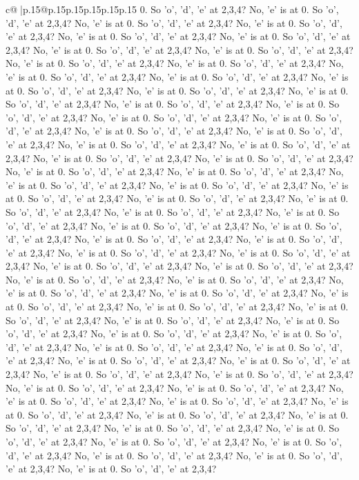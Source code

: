\documentclass{article}
\begin{document}
{\begin{supertabular}{c@{$\;$}|p{.15\linewidth}@{}p{.15\linewidth}p{.15\linewidth}p{.15\linewidth}p{.15\linewidth}p{.15\linewidth}}
{{{0. So 'o', 'd', 'e' at 2,3,4? No, 'e' is at 0. So 'o', 'd', 'e' at 2,3,4? No, 'e' is at 0. So 'o', 'd', 'e' at 2,3,4? No, 'e' is at 0. So 'o', 'd', 'e' at 2,3,4? No, 'e' is at 0. So 'o', 'd', 'e' at 2,3,4? No, 'e' is at 0. So 'o', 'd', 'e' at 2,3,4? No, 'e' is at 0. So 'o', 'd', 'e' at 2,3,4? No, 'e' is at 0. So 'o', 'd', 'e' at 2,3,4? No, 'e' is at 0. So 'o', 'd', 'e' at 2,3,4? No, 'e' is at 0. So 'o', 'd', 'e' at 2,3,4? No, 'e' is at 0. So 'o', 'd', 'e' at 2,3,4? No, 'e' is at 0. So 'o', 'd', 'e' at 2,3,4? No, 'e' is at 0. So 'o', 'd', 'e' at 2,3,4? No, 'e' is at 0. So 'o', 'd', 'e' at 2,3,4? No, 'e' is at 0. So 'o', 'd', 'e' at 2,3,4? No, 'e' is at 0. So 'o', 'd', 'e' at 2,3,4? No, 'e' is at 0. So 'o', 'd', 'e' at 2,3,4? No, 'e' is at 0. So 'o', 'd', 'e' at 2,3,4? No, 'e' is at 0. So 'o', 'd', 'e' at 2,3,4? No, 'e' is at 0. So 'o', 'd', 'e' at 2,3,4? No, 'e' is at 0. So 'o', 'd', 'e' at 2,3,4? No, 'e' is at 0. So 'o', 'd', 'e' at 2,3,4? No, 'e' is at 0. So 'o', 'd', 'e' at 2,3,4? No, 'e' is at 0. So 'o', 'd', 'e' at 2,3,4? No, 'e' is at 0. So 'o', 'd', 'e' at 2,3,4? No, 'e' is at 0. So 'o', 'd', 'e' at 2,3,4? No, 'e' is at 0. So 'o', 'd', 'e' at 2,3,4? No, 'e' is at 0. So 'o', 'd', 'e' at 2,3,4? No, 'e' is at 0. So 'o', 'd', 'e' at 2,3,4? No, 'e' is at 0. So 'o', 'd', 'e' at 2,3,4? No, 'e' is at 0. So 'o', 'd', 'e' at 2,3,4? No, 'e' is at 0. So 'o', 'd', 'e' at 2,3,4? No, 'e' is at 0. So 'o', 'd', 'e' at 2,3,4? No, 'e' is at 0. So 'o', 'd', 'e' at 2,3,4? No, 'e' is at 0. So 'o', 'd', 'e' at 2,3,4? No, 'e' is at 0. So 'o', 'd', 'e' at 2,3,4? No, 'e' is at 0. So 'o', 'd', 'e' at 2,3,4? No, 'e' is at 0. So 'o', 'd', 'e' at 2,3,4? No, 'e' is at 0. So 'o', 'd', 'e' at 2,3,4? No, 'e' is at 0. So 'o', 'd', 'e' at 2,3,4? No, 'e' is at 0. So 'o', 'd', 'e' at 2,3,4? No, 'e' is at 0. So 'o', 'd', 'e' at 2,3,4? No, 'e' is at 0. So 'o', 'd', 'e' at 2,3,4? No, 'e' is at 0. So 'o', 'd', 'e' at 2,3,4? No, 'e' is at 0. So 'o', 'd', 'e' at 2,3,4? No, 'e' is at 0. So 'o', 'd', 'e' at 2,3,4? No, 'e' is at 0. So 'o', 'd', 'e' at 2,3,4? No, 'e' is at 0. So 'o', 'd', 'e' at 2,3,4? No, 'e' is at 0. So 'o', 'd', 'e' at 2,3,4? No, 'e' is at 0. So 'o', 'd', 'e' at 2,3,4? No, 'e' is at 0. So 'o', 'd', 'e' at 2,3,4? No, 'e' is at 0. So 'o', 'd', 'e' at 2,3,4? No, 'e' is at 0. So 'o', 'd', 'e' at 2,3,4? No, 'e' is at 0. So 'o', 'd', 'e' at 2,3,4? No, 'e' is at 0. So 'o', 'd', 'e' at 2,3,4? No, 'e' is at 0. So 'o', 'd', 'e' at 2,3,4? No, 'e' is at 0. So 'o', 'd', 'e' at 2,3,4? No, 'e' is at 0. So 'o', 'd', 'e' at 2,3,4? No, 'e' is at 0. So 'o', 'd', 'e' at 2,3,4? No, 'e' is at 0. So 'o', 'd', 'e' at 2,3,4? No, 'e' is at 0. So 'o', 'd', 'e' at 2,3,4? No, 'e' is at 0. So 'o', 'd', 'e' at 2,3,4? No, 'e' is at 0. So 'o', 'd', 'e' at 2,3,4? No, 'e' is at 0. So 'o', 'd', 'e' at 2,3,4? No, 'e' is at 0. So 'o', 'd', 'e' at 2,3,4? No, 'e' is at 0. So 'o', 'd', 'e' at 2,3,4? No, 'e' is at 0. So 'o', 'd', 'e' at 2,3,4? No, 'e' is at 0. So 'o', 'd', 'e' at 2,3,4? No, 'e' is at 0. So 'o', 'd', 'e' at 2,3,4? No, 'e' is at 0. So 'o', 'd', 'e' at 2,3,4? No, 'e' is at 0. So 'o', 'd', 'e' at 2,3,4? No, 'e' is at 0. So 'o', 'd', 'e' at 2,3,4? No, 'e' is at 0. So 'o', 'd', 'e' at 2,3,4? }}}
\end{supertabular}}
\end{document}

